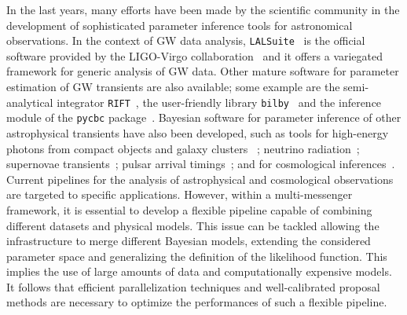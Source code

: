 \documentclass[prd,aps,twocolumn,a4paper,showkeys,nofootinbib,floatfix]{revtex4-1}
\begin{document}
In the last years, many efforts have been made by the scientific community 
in the development of sophisticated parameter inference 
tools for astronomical observations.
In the context of GW data analysis,
{\tt LALSuite}~\cite{lalsuite} is the official software provided by the LIGO-Virgo collaboration~\cite{TheLIGOScientific:2014jea,TheVirgo:2014hva} 
and it offers a variegated framework for generic analysis of GW data.
Other mature software for parameter estimation of GW transients are also available; 
some example are 
the semi-analytical integrator {\tt RIFT}~\cite{Pankow:2015cra,Lange:2018pyp},
the user-friendly library {\tt bilby}~\cite{Ashton:2018jfp}
and the inference module of the {\tt pycbc} package~\cite{Biwer:2018osg}.
Bayesian software for parameter inference of 
other astrophysical transients have also been developed, such as tools for 
 high-energy photons from compact objects and galaxy clusters ~\cite{2014ascl.soft08004N,heasarc_software,Olamaie:2013vfa};
 neutrino radiation~\cite{Aartsen:2019mbc};
 supernovae transients~\cite{Shariff:2015yoa,Hinton_2019,M_ller_2019};
 pulsar arrival timings~\cite{Edwards:2006zg,Lentati_2013,luo2021pint};
 and for cosmological inferences~\cite{Lewis:2002ah,Das:2014mda,Ishida:2015wla,Handley_2015}.
Current pipelines 
for the analysis of astrophysical and cosmological observations
are targeted to specific applications.
However, within a multi-messenger framework,
it is essential to develop a flexible pipeline
capable of combining different datasets and physical models.
This issue can be tackled allowing the infrastructure to
merge different Bayesian models, extending the considered parameter space 
and generalizing the definition of the likelihood function.
This implies the use of large amounts of data and 
computationally expensive models. It follows that efficient parallelization
techniques and well-calibrated proposal methods are necessary to 
optimize the performances of such a flexible pipeline.
\end{document}
